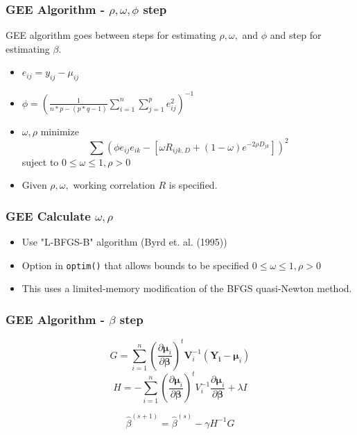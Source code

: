 \documentclass{beamer}
\begin{document}
\begin{frame}
\frametitle{GEE Algorithm - $\rho, \omega, \phi$ step}

GEE algorithm goes between steps for estimating $\rho, \omega, $ and $\phi$ and step for estimating $\beta$.

\begin{itemize}
  \item $e_{ij} = y_{ij} - \mu_{ij}$
  \item $\phi = \left(\frac{1}{n*p - (p*q - 1)}\sum_{i = 1}^n \sum_{j = 1}^p e_{ij}^2 \right) ^{-1}$
  \item $\omega, \rho$ minimize
  \[ \sum (\phi e_{ij}e_{ik} - [ \omega R_{ijk,D} + (1 - \omega) e^{-2 \rho D_{jk}}])^2  \]
  suject to $0 \leq \omega \leq 1, \rho > 0$
  \item Given $\rho, \omega,$ working correlation $R$ is specified.
\end{itemize}

\end{frame}



\begin{frame}
\frametitle{GEE Calculate $\omega, \rho$}
\begin{itemize}
  \item Use "L-BFGS-B" algorithm (Byrd et. al. (1995))
  \item Option in \texttt{optim()} that allows bounds to be specified $0 \leq \omega \leq 1, \rho > 0$
  \item This uses a limited-memory modification of the BFGS quasi-Newton method.
\end{itemize}
\end{frame}

\begin{frame}
\frametitle{GEE Algorithm - $\beta$ step}

\[G =  \sum_{i = 1}^n  \left(\frac{\partial  \boldsymbol\mu_i }{\partial \boldsymbol\beta }\right)^t\mathbf{V}_i^{-1}(\mathbf{Y_i} - \boldsymbol\mu_i)\]
\[H = - \sum_{i=1}^n \left(\frac{\partial  \boldsymbol\mu_i }{\partial \boldsymbol\beta }\right)^t V_i ^{-1} \frac{\partial  \boldsymbol\mu_i }{\partial \boldsymbol\beta } + \lambda I \]

\[\hat\beta^{(s +1)} = \hat\beta^{(s)} - \gamma H ^{-1} G \]


\end{frame}
\end{document}
